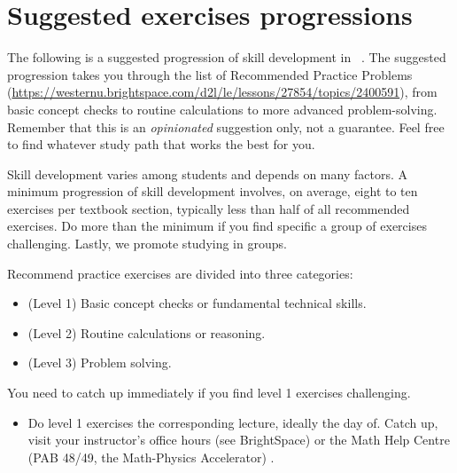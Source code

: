 \documentclass[./main.tex]{subfiles}
\begin{document}
\pagestyle{empty}
\section*{Suggested exercises progressions}

The following is a suggested progression of skill development in \thecoursesubject{}~\thecoursenumb{}.  The suggested progression takes you through the list of Recommended Practice Problems (\url{https://westernu.brightspace.com/d2l/le/lessons/27854/topics/2400591}), from basic concept checks to routine calculations to more advanced problem-solving.  Remember that this is an \emph{opinionated} suggestion only, not a guarantee. Feel free to find whatever study path that works the best for you.

Skill development varies among students and depends on many factors. A minimum progression of skill development involves, on average, eight to ten exercises per textbook section, typically less than half of all recommended exercises. Do more than the minimum if you find specific a group of exercises challenging. Lastly, we promote studying in groups.

Recommend practice exercises are divided into three categories: 
\begin{itemize}
  \item (Level 1) Basic concept checks or fundamental technical skills.
  \item (Level 2) Routine calculations or reasoning.
  \item (Level 3) Problem solving.
\end{itemize}

You need to catch up immediately if you find level 1 exercises challenging.
\begin{itemize}
  \item Do level 1 exercises  the corresponding lecture, ideally the day of. Catch up, visit your instructor's office hours (see BrightSpace) or the Math Help Centre (PAB 48/49, the Math-Physics Accelerator) .
\end{itemize}
\end{document}
